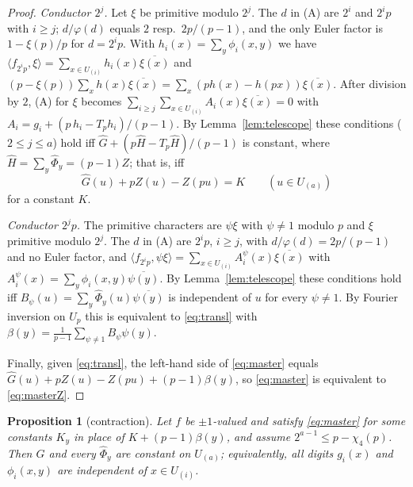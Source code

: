 \documentclass[11pt,a4paper]{article}
\newtheorem{proposition}[theorem]{Proposition}
\theoremstyle{definition}
\theoremstyle{remark}
\newcommand{\ip}[2]{\langle #1,#2\rangle}
\newcommand{\Ga}{\widehat G}
\newcommand{\Ph}{\widehat\Phi}
\newcommand{\Hh}{\widehat H}
\newcommand{\Uu}[1]{U_{(#1)}}
\begin{document}
\begin{proof}
\emph{Conductor $2^j$.} Let $\xi$ be primitive modulo $2^j$. The $d$ in (A) are $2^i$ and $2^ip$ with $i\ge j$; $d/\varphi(d)$ equals $2$ resp.\ $2p/(p-1)$, and the only Euler factor is $1-\xi(p)/p$ for $d=2^ip$. With $h_i(x)=\sum_y\phi_i(x,y)$ we have $\ip{f_{2^ip}}{\xi}=\sum_{x\in\Uu i}h_i(x)\overline{\xi(x)}$ and $(p-\xi(p))\sum_xh(x)\overline{\xi(x)}=\sum_x(ph(x)-h(px))\overline{\xi(x)}$. After division by $2$, (A) for $\xi$ becomes
$\sum_{i\ge j}\sum_{x\in\Uu i}A_i(x)\overline{\xi(x)}=0$ with $A_i=g_i+(p\,h_i-T_ph_i)/(p-1)$. By Lemma~\ref{lem:telescope} these conditions ($2\le j\le a$) hold iff $\Ga+(p\Hh-T_p\Hh)/(p-1)$ is constant, where $\Hh=\sum_y\Ph_y=(p-1)Z$; that is, iff
\begin{equation}\label{eq:masterZ}
\Ga(u)+pZ(u)-Z(pu)=K\qquad(u\in\Uu a)
\end{equation}
for a constant $K$.

\emph{Conductor $2^jp$.} The primitive characters are $\psi\xi$ with $\psi\ne1$ modulo $p$ and $\xi$ primitive modulo $2^j$. The $d$ in (A) are $2^ip$, $i\ge j$, with $d/\varphi(d)=2p/(p-1)$ and no Euler factor, and $\ip{f_{2^ip}}{\psi\xi}=\sum_{x\in\Uu i}A^\psi_i(x)\overline{\xi(x)}$ with $A^\psi_i(x)=\sum_y\phi_i(x,y)\overline{\psi(y)}$. By Lemma~\ref{lem:telescope} these conditions hold iff $B_\psi(u)=\sum_y\Ph_y(u)\overline{\psi(y)}$ is independent of $u$ for every $\psi\neq1$. By Fourier inversion on $U_p$ this is equivalent to \eqref{eq:transl} with $\beta(y)=\frac1{p-1}\sum_{\psi\ne1}B_\psi\psi(y)$.

Finally, given \eqref{eq:transl}, the left-hand side of \eqref{eq:master} equals $\Ga(u)+pZ(u)-Z(pu)+(p-1)\beta(y)$, so \eqref{eq:master} is equivalent to \eqref{eq:masterZ}.
\end{proof}

\begin{proposition}[contraction]\label{prop:contraction}
Let $f$ be $\pm1$-valued and satisfy \eqref{eq:master} for some constants $K_y$ in place of $K+(p-1)\beta(y)$, and assume $2^{a-1}\le p-\chi_4(p)$. Then $\Ga$ and every $\Ph_y$ are constant on $\Uu a$; equivalently, all digits $g_i(x)$ and $\phi_i(x,y)$ are independent of $x\in\Uu i$.
\end{proposition}
\end{document}
